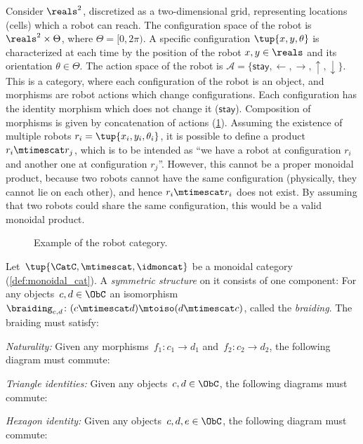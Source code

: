 \begin{example}
  \label{ex:robot}
  Consider $\reals^2$, discretized as a two-dimensional grid, representing locations (cells) which a robot can reach. The configuration space of the robot is $\reals^2\times \Theta$, where $\Theta=[0,2\pi)$. A specific configuration $\tup{x,y,\theta}$ is characterized at each time by the position of the robot $x,y\in \reals$ and its orientation $\theta \in \Theta$. The action space of the robot is $\mathcal{A}=\{\mathsf{stay},\leftarrow, \rightarrow, \uparrow, \downarrow\}$. This is a category, where each configuration of the robot is an object, and morphisms are robot actions which change configurations. Each configuration has the identity morphism which does not change it ($\mathsf{stay}$). Composition of morphisms is given by concatenation of actions (\cref{fig:robotcategory}). Assuming the existence of multiple robots $r_i=\tup{x_i,y_i,\theta_i}$, it is possible to define a product $r_i\mtimescat r_j$, which is to be intended as ``we have a robot at configuration $r_i$ and another one at configuration $r_j$''. However, this cannot be a proper monoidal product, because two robots cannot have the same configuration (physically, they cannot lie on each other), and hence $r_i\mtimescat r_i$ does not exist. By assuming that two robots could share the same configuration, this would be a valid monoidal product.
  \begin{figure}[tbh]
    \begin{center}
    \end{center}
    \caption{Example of the robot category. \label{fig:robotcategory}}
  \end{figure}
\end{example}


\begin{ctdefinition}
  Let~$\tup{\CatC,\mtimescat,\idmoncat}$ be a monoidal category (\cref{def:monoidal_cat}). A \emph{symmetric structure} on it consists of one component: For any objects~$c,d\in\ObC$ an isomorphism~$\braiding_{c,d}\colon (c\mtimescat d)\mtoiso (d\mtimescat c)$, called the \emph{braiding}. The braiding must satisfy:
  \begin{compactenum}
    \item \emph{Naturality:} Given any morphisms~$f_1\colon c_1\to d_1$ and~$f_2\colon c_2\to d_2$, the following diagram must commute:
    \begin{center}
    \end{center}
    \item \emph{Triangle identities:} Given any objects~$c,d\in\ObC$, the following diagrams must commute:
    \begin{center}
    \end{center}
    \item \emph{Hexagon identity:} Given any objects~$c,d,e\in \ObC$, the following diagram must commute:
    \begin{center}
    \end{center}
  \end{compactenum}
\end{ctdefinition}
